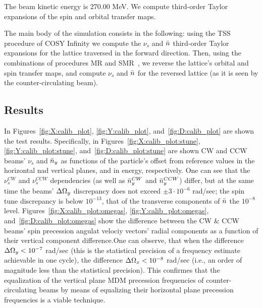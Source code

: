 The beam kinetic energy is 270.00 MeV. We compute third-order Taylor expansions of the
spin and orbital transfer maps.

The main body of the simulation consists in the following: using the TSS~\cite[p.~41]{COSYINF:BeamPhysMan}
procedure
of COSY Infinity we compute the $\nu_s$ and $\bar n$ third-order Taylor expansions for the lattice traversed
in the forward direction.
Then, using the combinations of procedures MR and SMR~\cite[p.~233]{Eremey:Thesis}, we reverse
the lattice's orbital and spin transfer maps, and compute $\nu_s$ and $\bar n$
for the reversed lattice (as it is seen by the counter-circulating beam).


\subsection{Results}

In Figures~\ref{fig:X:calib_plot}, \ref{fig:Y:calib_plot}, and~\ref{fig:D:calib_plot} are shown the
test results. Specifically, in Figures~\ref{fig:X:calib_plot:stune},
\ref{fig:Y:calib_plot:stune}, and~\ref{fig:D:calib_plot:stune} are shown CW and CCW beams' $\nu_s$ and $\bar n_y$
as functions of the particle's offset from reference values in the horizontal nad vertical planes,
and in energy, respectively. One can see that the $\nu_s^{CW}$ and $\nu_s^{CCW}$ dependencies (as well as
$\bar n_y^{CW}$ and $\bar n_y^{CCW}$) differ, but at the same time the beams' $\Delta\Omega_y$ discrepancy does not
exceed $\pm3\cdot10^{-6}$ rad/sec; the spin tune discrepancy is below $10^{-13}$, that of the transverse
components of $\bar n$ the $10^{-8}$ level. Figures~\ref{fig:X:calib_plot:omegas}, \ref{fig:Y:calib_plot:omegas},
and~\ref{fig:D:calib_plot:omegas} show the difference between the CW \& CCW beams' spin precession
angulat velociy vectors' radial components as a function of their vertical component difference.One can observe,
that when the difference $\Delta\Omega_y < 10^{-7}$ rad/sec (this is the statistical precision
of a frequency estimate achievable in one cycle), the difference $\Delta \Omega_x < 10^{-8}$  rad/sec (i.e.,
an order of magnitude less than the statistical precision).
This confirmes that the equalization of the vertical plane MDM precession frequencies of counter-circulating
beams by means of equalizing their horizontal plane precession frequencies is a viable technique.

